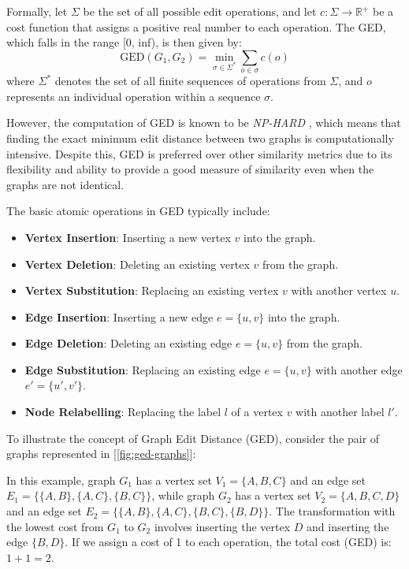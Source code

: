 \documentclass[../Thesis.tex]{subfiles}
\begin{document}
	Formally, let $\Sigma$ be the set of all possible edit operations, and let $c: \Sigma \to \mathbb{R}^+$ be a cost function that assigns a positive real number to each operation. The GED, which falls in the range [0, inf), is then given by:
	\[
	\text{GED}(G_1, G_2) = \min_{\sigma \in \Sigma^*} \sum_{o \in \sigma} c(o)
	\]
	where $\Sigma^*$ denotes the set of all finite sequences of operations from $\Sigma$, and $o$ represents an individual operation within a sequence $\sigma$.
	
	However, the computation of GED is known to be \emph{NP-HARD} \cite{complexityclasses}, which means that finding the exact minimum edit distance between two graphs is computationally intensive. Despite this, GED is preferred over other similarity metrics due to its flexibility and ability to provide a good measure of similarity even when the graphs are not identical.
	
	The basic atomic operations in GED typically include:
	
	\begin{itemize}
		\item \textbf{Vertex Insertion}: Inserting a new vertex $v$ into the graph.
		\item \textbf{Vertex Deletion}: Deleting an existing vertex $v$ from the graph.
		\item \textbf{Vertex Substitution}: Replacing an existing vertex $v$ with another vertex $u$.
		\item \textbf{Edge Insertion}: Inserting a new edge $e = \{u, v\}$ into the graph.
		\item \textbf{Edge Deletion}: Deleting an existing edge $e = \{u, v\}$ from the graph.
		\item \textbf{Edge Substitution}: Replacing an existing edge $e = \{u, v\}$ with another edge $e' = \{u', v'\}$.
		\item \textbf{Node Relabelling}: Replacing the label $l$ of a vertex $v$ with another label $l'$.
	\end{itemize}
	
	To illustrate the concept of Graph Edit Distance (GED), consider the pair of graphs represented in [\autoref{fig:ged-graphs}]:
	
	In this example, graph $G_1$ has a vertex set $V_1 = \{A, B, C\}$ and an edge set $E_1 = \{\{A, B\}, \{A, C\}, \{B, C\}\}$, while graph $G_2$ has a vertex set $V_2 = \{A, B, C, D\}$ and an edge set $E_2 = \{\{A, B\}, \{A, C\}, \{B, C\}, \{B, D\}\}$. The transformation with the lowest cost from $G_1$ to $G_2$ involves inserting the vertex $D$ and inserting the edge $\{B, D\}$. If we assign a cost of 1 to each operation, the total cost (GED) is: $1+1=2$.
	
\end{document}
